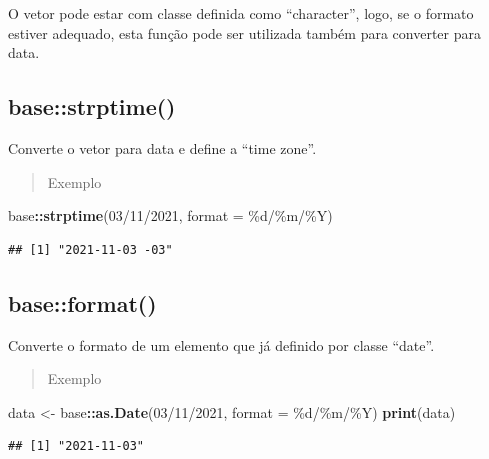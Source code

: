 \documentclass[
]{book}
\newenvironment{Shaded}{\begin{snugshade}}{\end{snugshade}}
\newcommand{\AttributeTok}[1]{\textcolor[rgb]{0.13,0.29,0.53}{#1}}
\newcommand{\FunctionTok}[1]{\textcolor[rgb]{0.13,0.29,0.53}{\textbf{#1}}}
\newcommand{\NormalTok}[1]{#1}
\newcommand{\OtherTok}[1]{\textcolor[rgb]{0.56,0.35,0.01}{#1}}
\newcommand{\SpecialCharTok}[1]{\textcolor[rgb]{0.81,0.36,0.00}{\textbf{#1}}}
\newcommand{\StringTok}[1]{\textcolor[rgb]{0.31,0.60,0.02}{#1}}
\theoremstyle{definition}
\theoremstyle{definition}
\theoremstyle{definition}
\theoremstyle{definition}
\theoremstyle{remark}
\begin{document}
O vetor pode estar com classe definida como ``character'', logo, se o formato estiver adequado, esta função pode ser utilizada também para converter para data.

\hypertarget{basestrptime}{%
\subsection{base::strptime()}\label{basestrptime}}

Converte o vetor para data e define a ``time zone''.

\begin{quote}
Exemplo
\end{quote}

\begin{Shaded}
\begin{Highlighting}[]
\NormalTok{base}\SpecialCharTok{::}\FunctionTok{strptime}\NormalTok{(}\StringTok{\textquotesingle{}03/11/2021\textquotesingle{}}\NormalTok{, }\AttributeTok{format =} \StringTok{\textquotesingle{}\%d/\%m/\%Y\textquotesingle{}}\NormalTok{)}
\end{Highlighting}
\end{Shaded}

\begin{verbatim}
## [1] "2021-11-03 -03"
\end{verbatim}

\hypertarget{baseformat}{%
\subsection{base::format()}\label{baseformat}}

Converte o formato de um elemento que já definido por classe ``date''.

\begin{quote}
Exemplo
\end{quote}

\begin{Shaded}
\begin{Highlighting}[]
\NormalTok{data }\OtherTok{\textless{}{-}}\NormalTok{ base}\SpecialCharTok{::}\FunctionTok{as.Date}\NormalTok{(}\StringTok{\textquotesingle{}03/11/2021\textquotesingle{}}\NormalTok{, }\AttributeTok{format =} \StringTok{\textquotesingle{}\%d/\%m/\%Y\textquotesingle{}}\NormalTok{)}
\FunctionTok{print}\NormalTok{(data)}
\end{Highlighting}
\end{Shaded}

\begin{verbatim}
## [1] "2021-11-03"
\end{verbatim}
\end{document}
